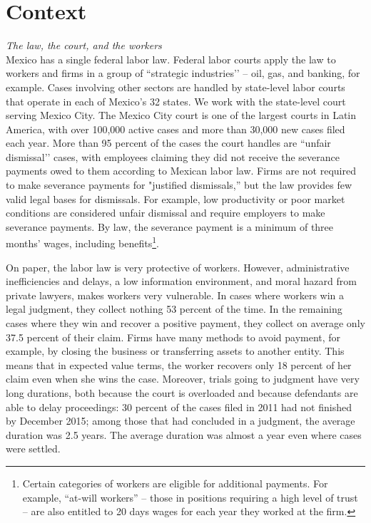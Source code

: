 \documentclass[oneside,12pt]{article}
\begin{document}

\section{Context} \label{sec:context}
\emph{The law, the court, and the workers}\\
Mexico has a single federal labor law. Federal labor courts apply the law to workers and firms in a group of “strategic industries’’ – oil, gas, and banking, for example. Cases involving other sectors are handled by state-level labor courts that operate in each of Mexico’s 32 states. We work with the state-level court serving Mexico City. The Mexico City court is one of the largest courts in Latin America, with over 100,000 active cases and more than 30,000 new cases filed each year. More than 95 percent of the cases the court handles are “unfair dismissal’’ cases, with employees claiming they did not receive the severance payments owed to them according to Mexican labor law. Firms are not required to make severance payments for "justified dismissals,” but the law provides few valid legal bases for dismissals. For example, low productivity or poor market conditions are considered unfair dismissal and require employers to make severance payments. By law, the severance payment is a minimum of three months' wages, including benefits\footnote{Certain categories of workers are eligible for additional payments. For example, “at-will workers” – those in positions requiring a high level of trust – are also entitled to 20 days wages for each year they worked at the firm.}. 

On paper, the labor law is very protective of workers. However, administrative inefficiencies and delays, a low information environment, and moral hazard from private lawyers, makes workers very vulnerable. In cases where workers win a legal judgment, they collect nothing 53 percent of the time. In the remaining cases where they win and recover a positive payment, they collect on average only 37.5 percent of their claim. Firms have many methods to avoid payment, for example, by closing the business or transferring assets to another entity. This means that in expected value terms, the worker recovers only 18 percent of her claim even when she wins the case. Moreover, trials going to judgment have very long durations, both because the court is overloaded and because defendants are able to delay proceedings: 30 percent of the cases filed in 2011 had not finished by December 2015; among those that had concluded in a judgment, the average duration was 2.5 years. The average duration was almost a year even where cases were settled.
\end{document}
